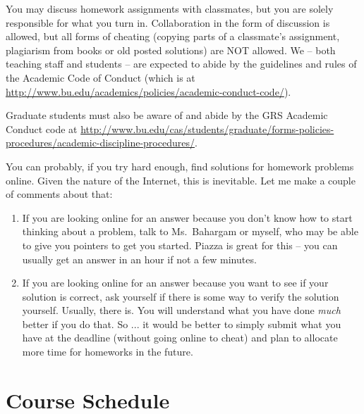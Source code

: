 \documentclass[11pt]{article}
\begin{document}
You may discuss homework assignments with classmates, but you are 
solely responsible for what you turn in. Collaboration in the form of
discussion is allowed, but all forms of cheating (copying parts of a
classmate's assignment, plagiarism from books or old posted solutions)
are NOT allowed. We -- both teaching staff and students -- are expected
to abide by the guidelines and rules of the Academic Code of Conduct
(which is at
\url{http://www.bu.edu/academics/policies/academic-conduct-code/}).

Graduate students must also be aware of and abide by the GRS Academic
Conduct code at \url{http://www.bu.edu/cas/students/graduate/forms-policies-procedures/academic-discipline-procedures/}.

You can probably, if you try hard enough, find solutions for homework
problems online.    Given the nature of the Internet, this is
inevitable.   Let me make a couple of comments about that:
\begin{enumerate}
\item If you are looking online for an answer because you don't know how
  to start thinking about a problem, talk to Ms.\ Bahargam or myself, who may be
  able to give you pointers to get you started.  Piazza is great for
  this -- you can usually get an answer in an hour if not a few minutes.
\item If you are looking online for an answer because you want to see if
  your solution is correct, ask yourself if there is some way to verify
  the solution yourself.   Usually, there is.  You will understand what you have done
  \emph{much} better if you do that.
So ... it would be better to simply submit what you have at the deadline
(without going online to cheat) and plan to allocate more time for
homeworks in the future.
\end{enumerate}

\newpage
\section*{Course Schedule}
\end{document}

